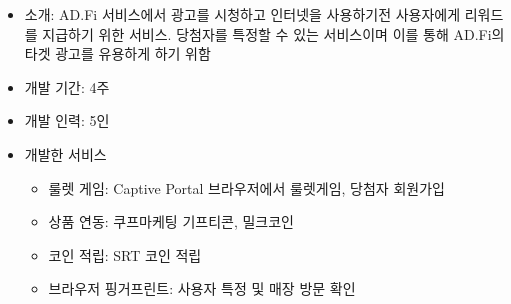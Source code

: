 \label{luckyfi}

\begin{itemize}[label=]
	\item 소개: AD.Fi 서비스에서 광고를 시청하고 인터넷을 사용하기전 사용자에게 리워드를 지급하기 위한 서비스. 당첨자를 특정할 수 있는 서비스이며 이를 통해 AD.Fi의 타겟 광고를 유용하게 하기 위함
	\item 개발 기간: 4주
	\item 개발 인력: 5인
	\item 개발한 서비스
	      \begin{itemize}[label=]
		      \item 룰렛 게임: Captive Portal 브라우저에서 룰렛게임, 당첨자 회원가입
		      \item 상품 연동: 쿠프마케팅 기프티콘, 밀크코인
		      \item 코인 적립: SRT 코인 적립
		      \item 브라우저 핑거프린트: 사용자 특정 및 매장 방문 확인
	      \end{itemize}
\end{itemize}


\label{publicadfi}

